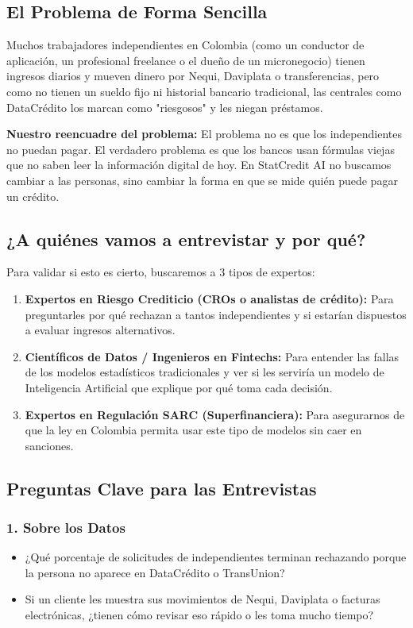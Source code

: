 \documentclass[11pt,a4paper]{article}
\begin{document}
\subsection{El Problema de Forma Sencilla}

Muchos trabajadores independientes en Colombia (como un conductor de aplicación, un profesional freelance o el dueño de un micronegocio) tienen ingresos diarios y mueven dinero por Nequi, Daviplata o transferencias, pero como no tienen un sueldo fijo ni historial bancario tradicional, las centrales como DataCrédito los marcan como "riesgosos" y les niegan préstamos.

\textbf{Nuestro reencuadre del problema:}
El problema no es que los independientes no puedan pagar. El verdadero problema es que los bancos usan fórmulas viejas que no saben leer la información digital de hoy. En StatCredit AI no buscamos cambiar a las personas, sino cambiar la forma en que se mide quién puede pagar un crédito.

\subsection{¿A quiénes vamos a entrevistar y por qué?}

Para validar si esto es cierto, buscaremos a 3 tipos de expertos:

\begin{enumerate}[leftmargin=*]
    \item \textbf{Expertos en Riesgo Crediticio (CROs o analistas de crédito):} Para preguntarles por qué rechazan a tantos independientes y si estarían dispuestos a evaluar ingresos alternativos.
    \item \textbf{Científicos de Datos / Ingenieros en Fintechs:} Para entender las fallas de los modelos estadísticos tradicionales y ver si les serviría un modelo de Inteligencia Artificial que explique por qué toma cada decisión.
    \item \textbf{Expertos en Regulación SARC (Superfinanciera):} Para asegurarnos de que la ley en Colombia permita usar este tipo de modelos sin caer en sanciones.
\end{enumerate}

\subsection{Preguntas Clave para las Entrevistas}

\subsubsection{1. Sobre los Datos}
\begin{itemize}[leftmargin=*]
    \item ¿Qué porcentaje de solicitudes de independientes terminan rechazando porque la persona no aparece en DataCrédito o TransUnion?
    \item Si un cliente les muestra sus movimientos de Nequi, Daviplata o facturas electrónicas, ¿tienen cómo revisar eso rápido o les toma mucho tiempo?
\end{itemize}
\end{document}
